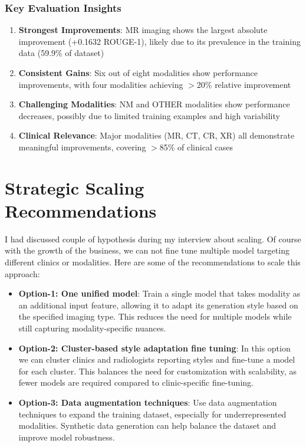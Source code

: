 \documentclass[11pt,letterpaper]{article}
\begin{document}
\subsubsection{Key Evaluation Insights}

\begin{enumerate}
    \item \textbf{Strongest Improvements}: MR imaging shows the largest absolute improvement (+0.1632 ROUGE-1), likely due to its prevalence in the training data (59.9\% of dataset)

    \item \textbf{Consistent Gains}: Six out of eight modalities show performance improvements, with four modalities achieving $>$20\% relative improvement

    \item \textbf{Challenging Modalities}: NM and OTHER modalities show performance decreases, possibly due to limited training examples and high variability

    \item \textbf{Clinical Relevance}: Major modalities (MR, CT, CR, XR) all demonstrate meaningful improvements, covering $>$85\% of clinical cases
\end{enumerate}

\section{Strategic Scaling Recommendations}
I had discussed couple of hypothesis during my interview about scaling. Of course with the growth of the business, we can not fine tune multiple model targeting different clinics or modalities. Here are some of the recommendations to scale this approach:
\begin{itemize}
    \item \textbf{Option-1: One unified model}: Train a single model that takes modality as an additional input feature, allowing it to adapt its generation style based on the specified imaging type. This reduces the need for multiple models while still capturing modality-specific nuances.
    \item \textbf{Option-2: Cluster-based style adaptation fine tuning}: In this option we can cluster clinics and radiologists reporting styles and fine-tune a model for each cluster. This balances the need for customization with scalability, as fewer models are required compared to clinic-specific fine-tuning.
    \item \textbf{Option-3: Data augmentation techniques}: Use data augmentation techniques to expand the training dataset, especially for underrepresented modalities. Synthetic data generation can help balance the dataset and improve model robustness.
\end{itemize}
\end{document}
